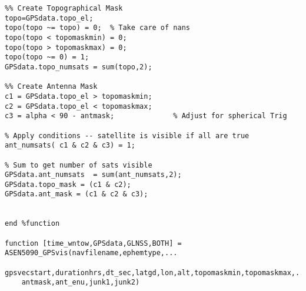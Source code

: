 \documentclass[12pt,a4paper,oneside]{article}
\begin{document}
\begin{appendix}
\begin{lstlisting}
%% Create Topographical Mask
topo=GPSdata.topo_el;
topo(topo ~= topo) = 0;  % Take care of nans
topo(topo < topomaskmin) = 0;
topo(topo > topomaskmax) = 0;
topo(topo ~= 0) = 1;
GPSdata.topo_numsats = sum(topo,2);

%% Create Antenna Mask
c1 = GPSdata.topo_el > topomaskmin;
c2 = GPSdata.topo_el < topomaskmax;
c3 = alpha < 90 - antmask;              % Adjust for spherical Trig

% Apply conditions -- satellite is visible if all are true
ant_numsats( c1 & c2 & c3) = 1;

% Sum to get number of sats visible
GPSdata.ant_numsats  = sum(ant_numsats,2);
GPSdata.topo_mask = (c1 & c2);
GPSdata.ant_mask = (c1 & c2 & c3);


end %function

function [time_wntow,GPSdata,GLNSS,BOTH] = ASEN5090_GPSvis(navfilename,ephemtype,...
    gpsvecstart,durationhrs,dt_sec,latgd,lon,alt,topomaskmin,topomaskmax,...
    antmask,ant_enu,junk1,junk2)


\end{lstlisting}
\end{appendix}
\end{document}
